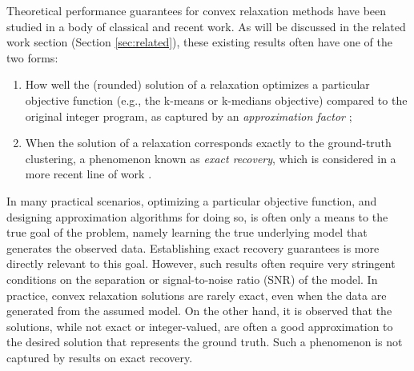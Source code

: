 Theoretical performance guarantees for convex relaxation methods have
been studied in a body of classical and recent work. As will be discussed
in the related work section (Section \ref{sec:related}), these existing
results often have one of the two forms:
\begin{enumerate}
\item How well the (rounded) solution of a relaxation optimizes a particular
objective function (e.g., the k-means or k-medians objective) compared
to the original integer program, as captured by an \emph{approximation
factor} \citep{charikar1999constant,kanungo2004local,peng2007approximating,li2016approximating};
\item When the solution of a relaxation corresponds exactly to the ground-truth
clustering, a phenomenon known as \emph{exact recovery}, which is
considered in a more recent line of work \citep{nellore2015recovery,awasthi2015relax,mixon2017clustering,iguchi2017certify,li2017kmeans}.
\end{enumerate}
In many practical scenarios, optimizing a particular objective function,
and designing approximation algorithms for doing so, is often only
a means to the true goal of the problem, namely learning the true
underlying model that generates the observed data. Establishing exact
recovery guarantees is more directly relevant to this goal. However,
such results often require very stringent conditions on the separation
or signal-to-noise ratio (SNR) of the model. In practice, convex relaxation
solutions are rarely exact, even when the data are generated from
the assumed model. On the other hand, it is observed that the solutions,
while not exact or integer-valued, are often a good approximation
to the desired solution that represents the ground truth. Such a phenomenon
is not captured by results on exact recovery.\\

